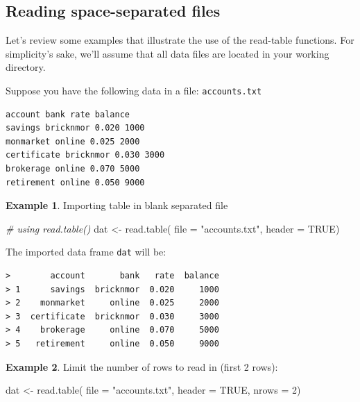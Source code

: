 \documentclass[
]{book}
\newenvironment{Shaded}{\begin{snugshade}}{\end{snugshade}}
\newcommand{\AttributeTok}[1]{\textcolor[rgb]{0.77,0.63,0.00}{#1}}
\newcommand{\CommentTok}[1]{\textcolor[rgb]{0.56,0.35,0.01}{\textit{#1}}}
\newcommand{\ConstantTok}[1]{\textcolor[rgb]{0.00,0.00,0.00}{#1}}
\newcommand{\DecValTok}[1]{\textcolor[rgb]{0.00,0.00,0.81}{#1}}
\newcommand{\FunctionTok}[1]{\textcolor[rgb]{0.00,0.00,0.00}{#1}}
\newcommand{\NormalTok}[1]{#1}
\newcommand{\OtherTok}[1]{\textcolor[rgb]{0.56,0.35,0.01}{#1}}
\newcommand{\StringTok}[1]{\textcolor[rgb]{0.31,0.60,0.02}{#1}}
\begin{document}
\hypertarget{reading-space-separated-files}{%
\subsection{Reading space-separated files}\label{reading-space-separated-files}}

Let's review some examples that illustrate the use of the read-table functions.
For simplicity's sake, we'll assume that all data files are located in your
working directory.

Suppose you have the following data in a file: \texttt{accounts.txt}

\begin{verbatim}
account bank rate balance
savings bricknmor 0.020 1000
monmarket online 0.025 2000
certificate bricknmor 0.030 3000
brokerage online 0.070 5000
retirement online 0.050 9000
\end{verbatim}

\textbf{Example 1}. Importing table in blank separated file

\begin{Shaded}
\begin{Highlighting}[]
\CommentTok{\# using read.table()}
\NormalTok{dat }\OtherTok{\textless{}{-}} \FunctionTok{read.table}\NormalTok{(}
  \AttributeTok{file =} \StringTok{"accounts.txt"}\NormalTok{, }
  \AttributeTok{header =} \ConstantTok{TRUE}\NormalTok{)}
\end{Highlighting}
\end{Shaded}

The imported data frame \texttt{dat} will be:

\begin{verbatim}
>        account       bank   rate  balance
> 1      savings  bricknmor  0.020     1000
> 2    monmarket     online  0.025     2000
> 3  certificate  bricknmor  0.030     3000
> 4    brokerage     online  0.070     5000
> 5   retirement     online  0.050     9000
\end{verbatim}

\textbf{Example 2}. Limit the number of rows to read in (first 2 rows):

\begin{Shaded}
\begin{Highlighting}[]
\NormalTok{dat }\OtherTok{\textless{}{-}} \FunctionTok{read.table}\NormalTok{(}
  \AttributeTok{file =} \StringTok{"accounts.txt"}\NormalTok{, }
  \AttributeTok{header =} \ConstantTok{TRUE}\NormalTok{,}
  \AttributeTok{nrows =} \DecValTok{2}\NormalTok{)}
\end{Highlighting}
\end{Shaded}
\end{document}
